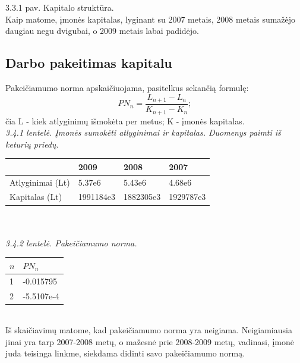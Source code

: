 \documentclass[11pt,a4paper]{article}
\begin{document}
\begin{center}
\end{center}
\textsf{3.3.1 pav. Kapitalo struktūra.}\\

Kaip matome, įmonės kapitalas, lyginant su 2007 metais, 2008 metais sumažėjo 
daugiau negu dvigubai, o 2009 metais labai padidėjo.

\subsection{Darbo pakeitimas kapitalu}

Pakeičiamumo norma apskaičiuojama, pasitelkus sekančią formulę:
\[
	PN_n = \frac{L_{n+1}-L_n}{K_{n+1}-K_{n}};
\]
čia L - kiek atlyginimų išmokėta per metus; K - įmonės kapitalas.\\
\textsl{3.4.1 lentelė. Įmonės sumokėti atlyginimai ir kapitalas. Duomenys paimti iš keturių priedų.}\\
\begin{tabular}{|p{4cm}|p{3cm}|p{3cm}|p{3cm}|} \hline
		& 2009 & 2008 & 2007 \\ \hline
	Atlyginimai (Lt) & 5.37e6 & 5.43e6 & 4.68e6 \\ \hline
	Kapitalas (Lt) & 1991184e3 & 1882305e3 & 1929787e3 \\ \hline
\end{tabular}\\\\
\textsl{3.4.2 lentelė. Pakeičiamumo norma.}\\
\begin{tabular}{|p{4cm}|p{4cm}|} \hline
	$n$ & $PN_n$ \\ \hline
	1   & -0.015795 \\ \hline
	2   & -5.5107e-4 \\ \hline
\end{tabular}\\

Iš skaičiavimų matome, kad pakeičiamumo norma yra neigiama. Neigiamiausia jinai yra 
tarp 2007-2008 metų, o mažesnė prie 2008-2009 metų, vadinasi, įmonė juda teisinga 
linkme, siekdama didinti savo pakeičiamumo normą.
\end{document}
